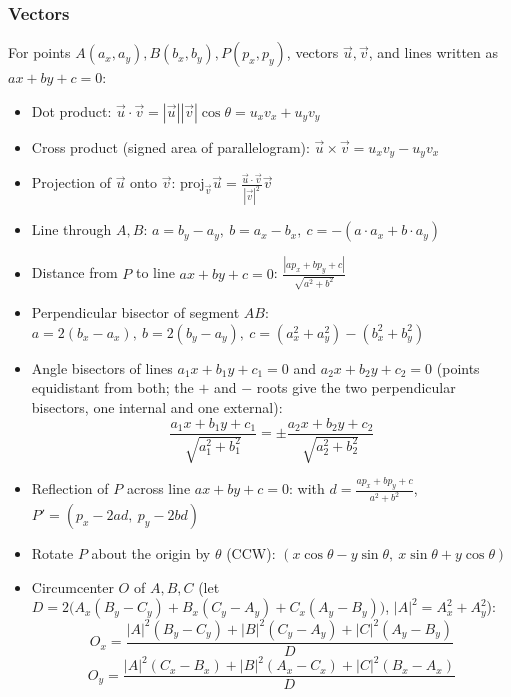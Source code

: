         \subsubsection{Vectors}
            For points $A(a_x, a_y), B(b_x, b_y), P(p_x, p_y)$, vectors $\vec u, \vec v$, and lines written as $ax + by + c = 0$:
            \begin{itemize}
                \item Dot product: $\vec u \cdot \vec v = |\vec u||\vec v|\cos\theta = u_x v_x + u_y v_y$
                \item Cross product (signed area of parallelogram): $\vec u \times \vec v = u_x v_y - u_y v_x$
                \item Projection of $\vec u$ onto $\vec v$: $\mathrm{proj}_{\vec v}\vec u = \frac{\vec u \cdot \vec v}{|\vec v|^2}\vec v$
                \item Line through $A, B$: $a = b_y - a_y,\ b = a_x - b_x,\ c = -(a \cdot a_x + b \cdot a_y)$
                \item Distance from $P$ to line $ax + by + c = 0$: $\frac{|a p_x + b p_y + c|}{\sqrt{a^2 + b^2}}$
                \item Perpendicular bisector of segment $AB$: $a = 2(b_x - a_x),\ b = 2(b_y - a_y),\ c = (a_x^2 + a_y^2) - (b_x^2 + b_y^2)$
                \item Angle bisectors of lines $a_1x + b_1y + c_1 = 0$ and $a_2x + b_2y + c_2 = 0$ (points equidistant from both; the $+$ and $-$ roots give the two perpendicular bisectors, one internal and one external):
                $$\frac{a_1 x + b_1 y + c_1}{\sqrt{a_1^2 + b_1^2}} = \pm\frac{a_2 x + b_2 y + c_2}{\sqrt{a_2^2 + b_2^2}}$$
                \item Reflection of $P$ across line $ax + by + c = 0$: with $d = \frac{a p_x + b p_y + c}{a^2 + b^2}$, $P' = (p_x - 2ad,\ p_y - 2bd)$
                \item Rotate $P$ about the origin by $\theta$ (CCW): $(x\cos\theta - y\sin\theta,\ x\sin\theta + y\cos\theta)$
                \item Circumcenter $O$ of $A, B, C$ (let $D = 2\bigl(A_x(B_y - C_y) + B_x(C_y - A_y) + C_x(A_y - B_y)\bigr)$, $|A|^2 = A_x^2 + A_y^2$):
                $$O_x = \frac{|A|^2(B_y - C_y) + |B|^2(C_y - A_y) + |C|^2(A_y - B_y)}{D}$$
                $$O_y = \frac{|A|^2(C_x - B_x) + |B|^2(A_x - C_x) + |C|^2(B_x - A_x)}{D}$$
            \end{itemize}
